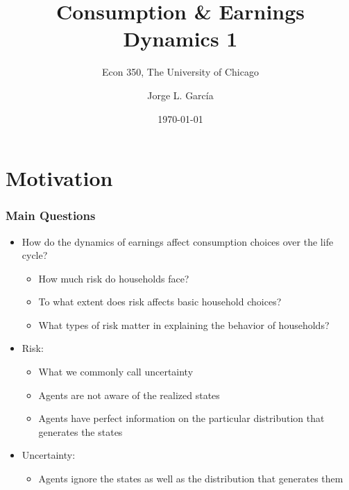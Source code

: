 

\title{Consumption \& Earnings Dynamics 1}
\subtitle{Econ 350, The University of Chicago}
\author{Jorge L. Garc\'{i}a}
\date{\today}






\begin{frame}[plain]
	\titlepage
\end{frame}



\section{Motivation}

\begin{frame}
	\frametitle{Main Questions}
\begin{itemize}
	\item How do the dynamics of earnings affect consumption choices over the life cycle?
		\begin{itemize}
			\item How much risk do households face?
			\item To what extent does risk affects basic household choices?
			\item What types of risk matter in explaining the behavior of households?		
		\end{itemize}
	\item Risk:
			\begin{itemize}
				\item What we commonly call uncertainty
				\item Agents are not aware of the realized states
				\item Agents have perfect information on the particular distribution that generates the states
			\end{itemize}
	\item Uncertainty:
			\begin{itemize}
				\item Agents ignore the states as well as the distribution that generates them
			\end{itemize}
\end{itemize}
\end{frame}

